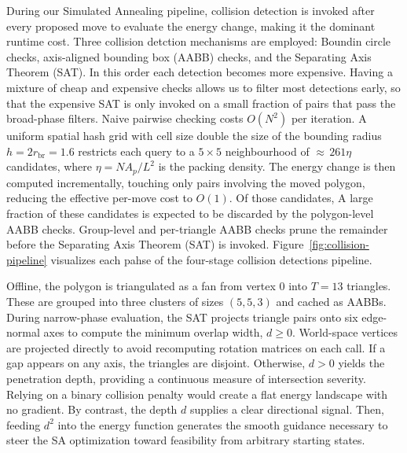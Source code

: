 \documentclass[10pt,twocolumn]{article}
\begin{document}
During our Simulated Annealing pipeline,
 collision detection is invoked after every proposed move to evaluate
the energy change, making it the dominant runtime cost. Three collision detction
mechanisms are employed: Boundin circle checks,
 axis-aligned bounding box (AABB) checks,
  and the Separating Axis Theorem (SAT).
  In this order each detection becomes more expensive.
  Having a mixture of cheap and expensive checks allows us to 
  filter most detections early, so that the expensive SAT is only invoked on a small
   fraction of pairs that pass the broad-phase filters.
Naive pairwise checking costs $O(N^2)$ per iteration. 
A uniform spatial hash grid
with cell size double the size of the bounding radius $h = 2r_{\mathrm{br}} = 1.6$ restricts each query to a
$5 \times 5$ neighbourhood of ${\approx}\,261\eta$ candidates, where
$\eta = NA_p/L^2$ is the packing density. The energy change is then
computed incrementally, touching only pairs involving the moved
polygon, reducing the effective per-move cost to $O(1)$. Of those
candidates, A large fraction of these candidates is expected to be discarded by the
polygon-level AABB checks. Group-level and per-triangle
AABB checks prune the remainder before the Separating Axis Theorem
(SAT) is invoked. Figure~\ref{fig:collision-pipeline} visualizes
 each pahse of the
four-stage collision detections pipeline.

Offline, the polygon is triangulated as a fan from vertex 0
 into $T = 13$ triangles. These are grouped into three clusters
  of sizes $(5, 5, 3)$ and cached as AABBs. 
  During narrow-phase evaluation, the SAT projects triangle pairs onto
   six edge-normal axes to compute the minimum overlap width,
    $d \geq 0$. World-space vertices are projected directly
     to avoid recomputing rotation matrices on each call.
      If a gap appears on any axis, the triangles are disjoint.
       Otherwise, $d > 0$ yields the penetration depth,
        providing a continuous measure of intersection severity.
         Relying on a binary collision penalty would create a flat
          energy landscape with no gradient. By contrast,
           the depth $d$ supplies a clear directional signal.
            Then, feeding $d^2$ into the energy function generates
             the smooth guidance necessary to steer the SA 
             optimization toward feasibility from arbitrary
              starting states.
\end{document}
